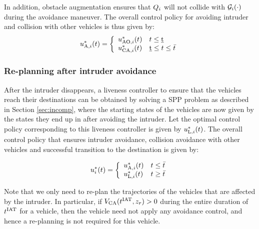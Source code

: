 In addition, obstacle augmentation ensures that $Q_i$ will not collide with $\mathcal{G}_i(\cdot)$ during the avoidance maneuver. %
The overall control policy for avoiding intruder and collision with other vehicles is thus given by:
\begin{equation*}
u^*_{\text{A}, i}(t) = 
\left \{ 
\begin{array}{ll}
u^*_{\text{AO}, i}(t) & t \leq \underbar{t}\\
u^*_{\text{CA}, i}(t) & \underbar{t} \leq t \leq \bar{t}
\end{array}
\right.
\end{equation*}

\subsubsection{Re-planning after intruder avoidance\label{sec:replan_method1}} 
After the intruder disappears, a liveness controller to ensure that the vehicles reach their destinations can be obtained by solving a SPP problem as described in Section \ref{sec:incomp}, where the starting states of the vehicles are now given by the states they end up in after avoiding the intruder.  
Let the optimal control policy corresponding to this liveness controller is given by $u^*_{\text{L}, i}(t)$. The overall control policy that ensures intruder avoidance, collision avoidance with other vehicles and successful transition to the destination is given by:

\begin{equation*}
u_i^*(t) = 
\left \{ 
\begin{array}{ll}
u^*_{\text{A}, i}(t) & t \leq \bar{t}\\
u^*_{\text{L}, i}(t) & t \geq \bar{t}
\end{array}
\right.
\end{equation*}

\begin{remark}
Note that we only need to re-plan the trajectories of the vehicles that are affected by the intruder. In particular, if $V_\text{CA}(t^\text{IAT}, z_r) > 0$ during the entire duration of $t^\text{IAT}$ for a vehicle, then the vehicle need not apply any avoidance control, and hence a re-planning is not required for this vehicle. 
\end{remark}

